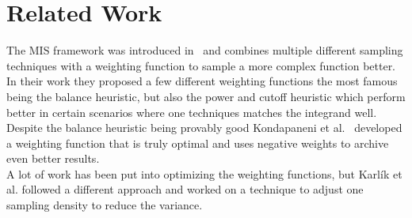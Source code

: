 \chapter{Related Work}
\label{ch:related_work}

The MIS framework was introduced in~\cite{veach_guibas}
and combines multiple different sampling techniques with a weighting function to sample a more complex function better.
In their work they proposed a few different weighting functions the most famous being the balance heuristic,
but also the power and cutoff heuristic which perform better in certain scenarios where one techniques matches the integrand well.
Despite the balance heuristic being provably good Kondapaneni et al.~\cite{Kondapaneni2019} developed a weighting function that is truly optimal
and uses negative weights to archive even better results.\\
A lot of work has been put into optimizing the weighting functions,
but Karl\'ik et al. followed a different approach
and worked on a technique to adjust one sampling density to reduce the variance.

